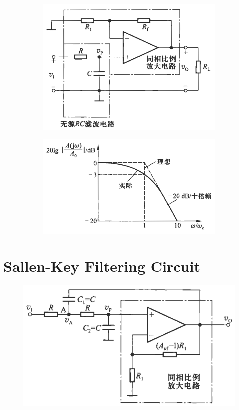 \begin{figure}[H]
  \centering
  \begin{subfigure}{.35\textwidth}
    \centering
    \includegraphics[width=\linewidth]{figures/Filter-with-source}
  \end{subfigure}
  \begin{subfigure}{.55\textwidth}
    \centering
    \includegraphics[width=\linewidth]{figures/Filter-with-source-graph}
  \end{subfigure}
\end{figure}

\section{Sallen-Key Filtering Circuit}

\begin{figure}[H]
  \centering
  \includegraphics[width=0.5\linewidth]{figures/Sallen-Key}
\end{figure}

